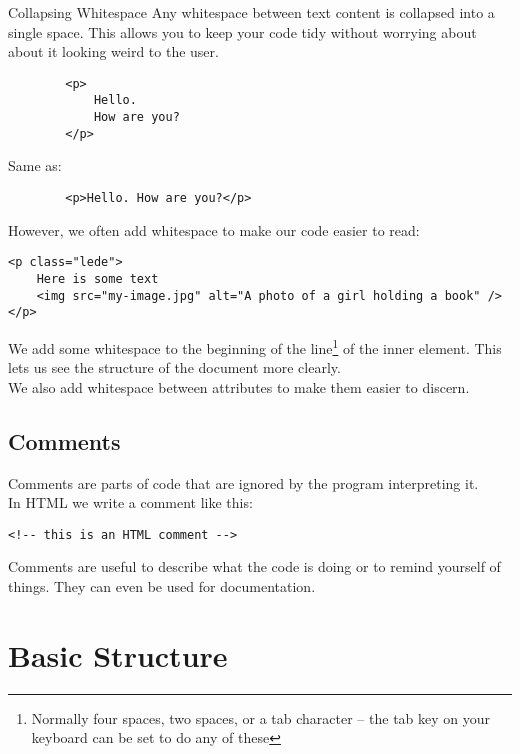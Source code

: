 \begin{infobox}{Collapsing Whitespace}
    Any whitespace between text content is collapsed into a single space. This allows you to keep your code tidy without worrying about about it looking weird to the user.

    \begin{verbatim}
        <p>
            Hello.
            How are you?
        </p>
    \end{verbatim}

    Same as:

    \begin{verbatim}
        <p>Hello. How are you?</p>
    \end{verbatim}
\end{infobox}

However, we often add whitespace to make our code easier to read:

\begin{verbatim}
<p class="lede">
    Here is some text
    <img src="my-image.jpg" alt="A photo of a girl holding a book" />
</p>
\end{verbatim}

We add some whitespace to the beginning of the line\footnote{Normally four spaces, two spaces, or a tab character – the tab key on your keyboard can be set to do any of these} of the inner element. This lets us see the structure of the document more clearly.
\\

We also add whitespace between attributes to make them easier to discern.


\subsection{Comments}

Comments are parts of code that are ignored by the program interpreting it.
\\

In HTML we write a comment like this:

\begin{verbatim}
<!-- this is an HTML comment -->
\end{verbatim}

Comments are useful to describe what the code is doing or to remind yourself of things. They can even be used for documentation.

\section{Basic Structure}

